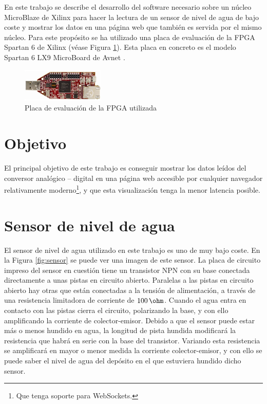 \documentclass[conference,compsoc]{IEEEtran}
\begin{document}
	En este trabajo se describe el desarrollo del software necesario sobre
	un n\'ucleo MicroBlaze de Xilinx para hacer la lectura de un sensor de
	nivel de agua de bajo coste y mostrar los datos en una p\'agina web que
	tambi\'en es servida por el mismo n\'ucleo. Para este prop\'osito se ha
	utilizado una placa de evaluaci\'on de la FPGA Spartan 6 de Xilinx
	(v\'ease Figura \ref{fig:fpga}). Esta placa en concreto es el modelo
	Spartan 6 LX9 MicroBoard de Avnet \cite{bib:avnet}.

	\begin{figure}[h!]
		\centering
		\includegraphics[width=0.35\textwidth]{./figuras/fpga.jpg}
		\caption{Placa de evaluaci\'on de la FPGA utilizada}
		\label{fig:fpga}
	\end{figure}

\section{Objetivo}

	El principal objetivo de este trabajo es conseguir mostrar los datos le\'idos del conversor
	anal\'ogico -- digital en una p\'agina web accesible por cualquier navegador relativamente
	moderno\footnote{Que tenga soporte para WebSockets.}, y que esta visualizaci\'on tenga la
	menor latencia posible.

\section{Sensor de nivel de agua}

	El sensor de nivel de agua utilizado en este trabajo es uno de muy bajo coste. En la Figura
	\ref{fig:sensor} se puede ver una imagen de este sensor. La placa de circuito impreso del sensor
	en cuesti\'on tiene un transistor NPN con su base conectada directamente a unas pistas en
	circuito abierto. Paralelas a las pistas en circuito abierto hay otras que est\'an conectadas a
	la tensi\'on de alimentaci\'on, a trav\'es de una resistencia limitadora de corriente de
	$100\,\ohm$. Cuando el agua entra en contacto con las pistas cierra el circuito, polarizando la
	base, y con ello amplificando la corriente de colector-emisor. Debido a que el sensor puede
	estar m\'as o menos hundido en agua, la longitud de pista hundida modificar\'a la resistencia
	que habr\'a en serie con la base del transistor. Variando esta resistencia se amplificar\'a en
	mayor o menor medida la corriente colector-emisor, y con ello se puede saber el nivel de agua
	del dep\'osito en el que estuviera hundido dicho sensor.
\end{document}

